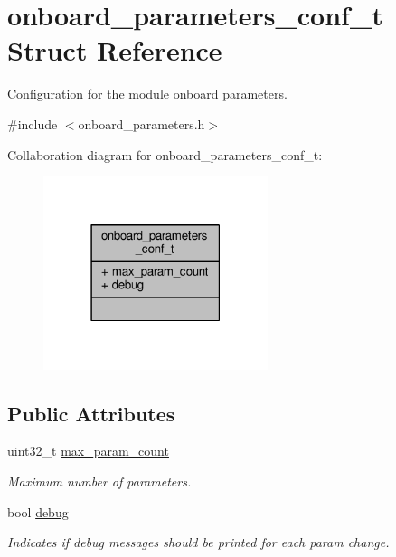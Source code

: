 \hypertarget{structonboard__parameters__conf__t}{\section{onboard\+\_\+parameters\+\_\+conf\+\_\+t Struct Reference}
\label{structonboard__parameters__conf__t}
}


Configuration for the module onboard parameters.  




{\ttfamily \#include $<$onboard\+\_\+parameters.\+h$>$}



Collaboration diagram for onboard\+\_\+parameters\+\_\+conf\+\_\+t\+:
\nopagebreak
\begin{figure}[H]
\begin{center}
\leavevmode
\includegraphics[width=186pt]{structonboard__parameters__conf__t__coll__graph}
\end{center}
\end{figure}
\subsection*{Public Attributes}
\begin{DoxyCompactItemize}
\item 
\hypertarget{structonboard__parameters__conf__t_a501537c44c0acd3358b841fe025abf0a}{uint32\+\_\+t \hyperlink{structonboard__parameters__conf__t_a501537c44c0acd3358b841fe025abf0a}{max\+\_\+param\+\_\+count}}\label{structonboard__parameters__conf__t_a501537c44c0acd3358b841fe025abf0a}

\begin{DoxyCompactList}\small\item\em Maximum number of parameters. \end{DoxyCompactList}\item 
\hypertarget{structonboard__parameters__conf__t_ad88ec8eb5bf69ea51da30ad0c7a7b93d}{bool \hyperlink{structonboard__parameters__conf__t_ad88ec8eb5bf69ea51da30ad0c7a7b93d}{debug}}\label{structonboard__parameters__conf__t_ad88ec8eb5bf69ea51da30ad0c7a7b93d}

\begin{DoxyCompactList}\small\item\em Indicates if debug messages should be printed for each param change. \end{DoxyCompactList}\end{DoxyCompactItemize}


